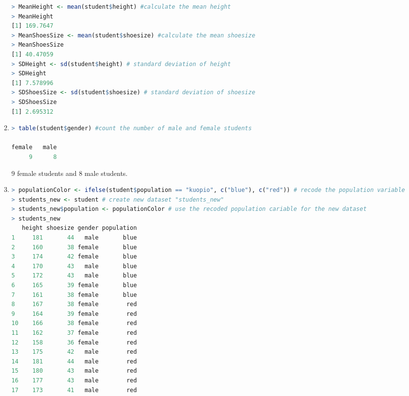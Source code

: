 \documentclass{article}
\begin{document}
\begin{enumerate}[leftmargin = 0 em, label = \arabic*., font = \bfseries]
\begin{enumerate}
\begin{lstlisting}[language = R]
> MeanHeight <- mean(student$height) #calculate the mean height
> MeanHeight
[1] 169.7647
> MeanShoesSize <- mean(student$shoesize) #calculate the mean shoesize
> MeanShoesSize
[1] 40.47059
> SDHeight <- sd(student$height) # standard deviation of height
> SDHeight
[1] 7.578996
> SDShoesSize <- sd(student$shoesize) # standard deviation of shoesize
> SDShoesSize
[1] 2.695312
\end{lstlisting}

\item
\begin{lstlisting}[language = R]
> table(student$gender) #count the number of male and female students

female   male 
     9      8 
\end{lstlisting}
9 female students and 8 male students.

\item
\begin{lstlisting}[language = R]
> populationColor <- ifelse(student$population == "kuopio", c("blue"), c("red")) # recode the population variable
> students_new <- student # create new dataset "students_new"
> students_new$population <- populationColor # use the recoded population cariable for the new dataset
> students_new
   height shoesize gender population
1     181       44   male       blue
2     160       38 female       blue
3     174       42 female       blue
4     170       43   male       blue
5     172       43   male       blue
6     165       39 female       blue
7     161       38 female       blue
8     167       38 female        red
9     164       39 female        red
10    166       38 female        red
11    162       37 female        red
12    158       36 female        red
13    175       42   male        red
14    181       44   male        red
15    180       43   male        red
16    177       43   male        red
17    173       41   male        red
\end{lstlisting}


\end{enumerate}
\end{enumerate}
\end{document}
